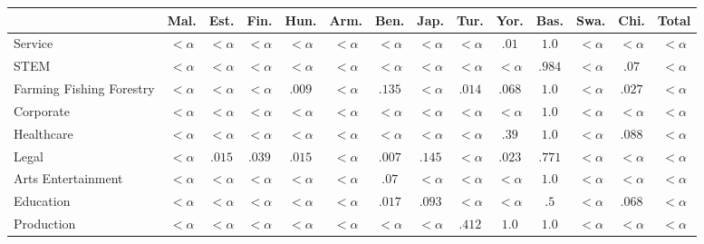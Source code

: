 \documentclass[fleqn,10pt]{article}
\begin{document}
\begin{table}[H]
\small
\begin{tabular}{|m{1.75cm}|cccccccccccc|c|}
\hline
& Mal. & Est. & Fin. & Hun. & Arm. & Ben. & Jap. & Tur. & Yor. & Bas. & Swa. & Chi. & Total \\ \hline
Service & $<\alpha$ & $<\alpha$ & $<\alpha$ & $<\alpha$ & $<\alpha$ & $<\alpha$ & $<\alpha$ & $<\alpha$ & \cellcolor{blue!25}$.01$ & \cellcolor{blue!25}$1.0$ & $<\alpha$ & $<\alpha$ & $<\alpha$  \\ \cline{1-1} 
STEM & $<\alpha$ & $<\alpha$ & $<\alpha$ & $<\alpha$ & $<\alpha$ & $<\alpha$ & $<\alpha$ & $<\alpha$ & $<\alpha$ & \cellcolor{blue!25}$.984$ & $<\alpha$ & \cellcolor{blue!25}$.07$ & $<\alpha$  \\ \cline{1-1} 
Farming 
 Fishing 
 Forestry & $<\alpha$ & $<\alpha$ & $<\alpha$ & \cellcolor{blue!25}$.009$ & $<\alpha$ & \cellcolor{blue!25}$.135$ & $<\alpha$ & \cellcolor{blue!25}$.014$ & \cellcolor{blue!25}$.068$ & \cellcolor{blue!25}$1.0$ & $<\alpha$ & \cellcolor{blue!25}$.027$ & $<\alpha$  \\ \cline{1-1} 
Corporate & $<\alpha$ & $<\alpha$ & $<\alpha$ & $<\alpha$ & $<\alpha$ & $<\alpha$ & $<\alpha$ & $<\alpha$ & $<\alpha$ & \cellcolor{blue!25}$1.0$ & $<\alpha$ & $<\alpha$ & $<\alpha$  \\ \cline{1-1} 
Healthcare & $<\alpha$ & $<\alpha$ & $<\alpha$ & $<\alpha$ & $<\alpha$ & $<\alpha$ & $<\alpha$ & $<\alpha$ & \cellcolor{blue!25}$.39$ & \cellcolor{blue!25}$1.0$ & $<\alpha$ & \cellcolor{blue!25}$.088$ & $<\alpha$  \\ \cline{1-1} 
Legal & $<\alpha$ & \cellcolor{blue!25}$.015$ & \cellcolor{blue!25}$.039$ & \cellcolor{blue!25}$.015$ & $<\alpha$ & \cellcolor{blue!25}$.007$ & \cellcolor{blue!25}$.145$ & $<\alpha$ & \cellcolor{blue!25}$.023$ & \cellcolor{blue!25}$.771$ & $<\alpha$ & $<\alpha$ & $<\alpha$  \\ \cline{1-1} 
Arts 
 Entertainment & $<\alpha$ & $<\alpha$ & $<\alpha$ & $<\alpha$ & $<\alpha$ & \cellcolor{blue!25}$.07$ & $<\alpha$ & $<\alpha$ & $<\alpha$ & \cellcolor{blue!25}$1.0$ & $<\alpha$ & $<\alpha$ & $<\alpha$  \\ \cline{1-1} 
Education & $<\alpha$ & $<\alpha$ & $<\alpha$ & $<\alpha$ & $<\alpha$ & \cellcolor{blue!25}$.017$ & \cellcolor{blue!25}$.093$ & $<\alpha$ & $<\alpha$ & \cellcolor{blue!25}$.5$ & $<\alpha$ & \cellcolor{blue!25}$.068$ & $<\alpha$  \\ \cline{1-1} 
Production & $<\alpha$ & $<\alpha$ & $<\alpha$ & $<\alpha$ & $<\alpha$ & $<\alpha$ & $<\alpha$ & \cellcolor{blue!25}$.412$ & \cellcolor{blue!25}$1.0$ & \cellcolor{blue!25}$1.0$ & $<\alpha$ & $<\alpha$ & $<\alpha$  \\ \cline{1-1} 

\end{tabular}
\end{table}
\end{document}
